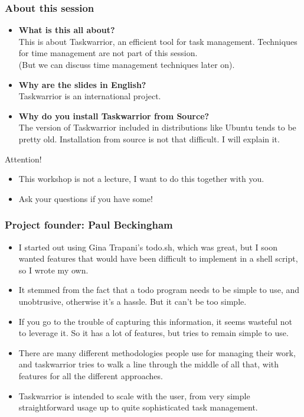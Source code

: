 \documentclass[t,handout]{beamer}
\begin{document}
\begin{frame}\frametitle{About this session}
\begin{itemize}
	\item \textbf{What is this all about?} \\
		This is about Taskwarrior, an efficient tool for task management. Techniques for time management are not part of this session. \pause \\
		(But we can discuss time management techniques later on).
	\item \textbf{Why are the slides in English?} \\
		Taskwarrior is an international project. \pause
	\item \textbf{Why do you install Taskwarrior from Source?} \\
		The version of Taskwarrior included in distributions like Ubuntu tends to be pretty old. Installation from source is not that difficult. I will explain it.
\end{itemize}

\begin{alertblock}{Attention!}
	\begin{itemize}
    	\item This workshop is not a lecture, I want to do this together with you.
    	\item Ask your questions if you have some!
	\end{itemize}
\end{alertblock}
\end{frame}

\begin{frame}\frametitle{Project founder: Paul Beckingham}
\pause
\begin{itemize}
	\item I started out using Gina Trapani's todo.sh, which was great, but I soon wanted features that would have been difficult to implement in a shell script, so I wrote my own. \pause
	\item It stemmed from the fact that a todo program needs to be simple to use, and unobtrusive, otherwise it's a hassle. But it can't be too simple. \pause
	\item If you go to the trouble of capturing this information, it seems wasteful not to leverage it.  So it has a lot of features, but tries to remain simple to use. \pause
	\item There are many different methodologies people use for managing their work, and taskwarrior tries to walk a line through the middle of all that, with features for all the different approaches. \pause
	\item Taskwarrior is intended to scale with the user, from very simple straightforward usage up to quite sophisticated task management.
\end{itemize}
\end{frame}
\end{document}
